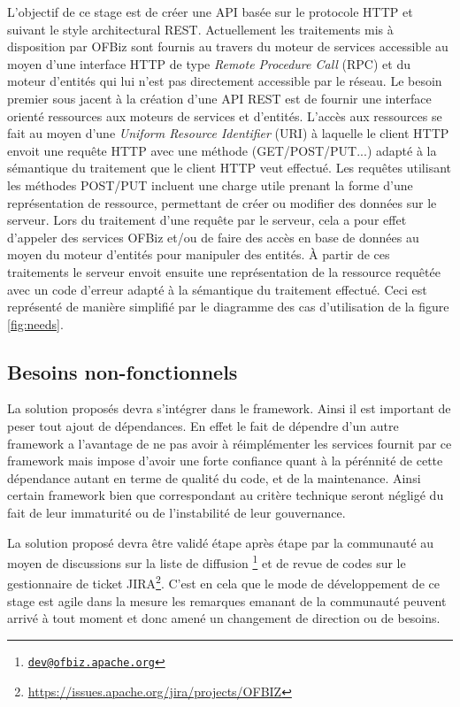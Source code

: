 \documentclass[a4paper, 11pt]{report}
\begin{document}
L'objectif de ce stage est de créer une API basée sur le protocole
HTTP et suivant le style architectural REST. Actuellement les
traitements mis à disposition par OFBiz sont fournis au travers du
moteur de services accessible au moyen d'une interface HTTP de type
\emph{Remote Procedure Call} (RPC) et du moteur d'entités qui lui
n'est pas directement accessible par le réseau. Le besoin premier
sous jacent à la création d'une API REST est de fournir une interface
orienté ressources aux moteurs de services et d'entités. L'accès aux
ressources se fait au moyen d'une \emph{Uniform Resource Identifier}
(URI) à laquelle le client HTTP envoit une requête HTTP avec une
méthode (GET/POST/PUT...) adapté à la sémantique du traitement que le
client HTTP veut effectué. Les requêtes utilisant les méthodes
POST/PUT incluent une charge utile prenant la forme d'une
représentation de ressource, permettant de créer ou modifier des
données sur le serveur. Lors du traitement d'une requête par le
serveur, cela a pour effet d'appeler des services OFBiz et/ou de faire
des accès en base de données au moyen du moteur d'entités pour
manipuler des entités. À partir de ces traitements le serveur envoit
ensuite une représentation de la ressource requêtée avec un code
d'erreur adapté à la sémantique du traitement effectué. Ceci est
représenté de manière simplifié par le diagramme des cas d'utilisation
de la figure \ref{fig:needs}.

\subsection{Besoins non-fonctionnels}

La solution proposés devra s'intégrer dans le framework. Ainsi il est
important de peser tout ajout de dépendances. En effet le fait de
dépendre d'un autre framework a l'avantage de ne pas avoir à
réimplémenter les services fournit par ce framework mais impose
d'avoir une forte confiance quant à la pérénnité de cette dépendance
autant en terme de qualité du code, et de la maintenance. Ainsi
certain framework bien que correspondant au critère technique seront
négligé du fait de leur immaturité ou de l'instabilité de leur
gouvernance.

La solution proposé devra être validé étape après étape par la
communauté au moyen de discussions sur la liste de diffusion
\footnote{\href{mailto:dev@ofbiz.apache.org}{\nolinkurl{dev@ofbiz.apache.org}}}
et de revue de codes sur le gestionnaire de ticket
JIRA\footnote{\url{https://issues.apache.org/jira/projects/OFBIZ}}. C'est
en cela que le mode de développement de ce stage est agile dans la
mesure les remarques emanant de la communauté peuvent arrivé à tout
moment et donc amené un changement de direction ou de besoins.
\end{document}
